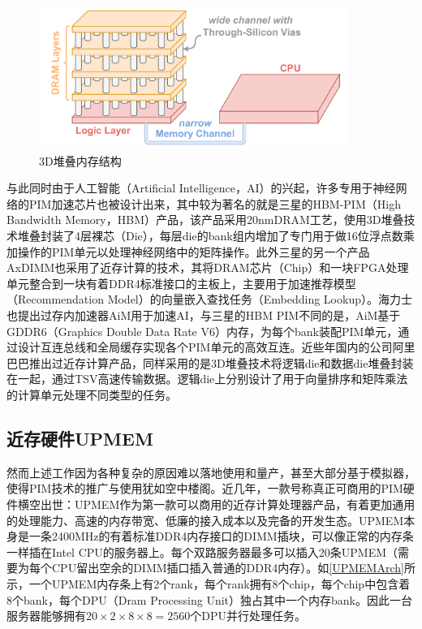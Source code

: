 \begin{figure}[!htbp]
	\centering
    \includegraphics[width=0.9\textwidth]{figures/3DStack.pdf}
    \caption{3D堆叠内存结构}
	\label{3DStack}
\end{figure}

与此同时由于人工智能（Artificial Intelligence，AI）的兴起，许多专用于神经网络的PIM加速芯片也被设计出来，其中较为著名的就是三星的HBM-PIM（High Bandwidth Memory，HBM）产品\cite{SamsungHBMPIM}，该产品采用20nmDRAM工艺，使用3D堆叠技术堆叠封装了4层裸芯（Die），每层die的bank组内增加了专门用于做16位浮点数乘加操作的PIM单元以处理神经网络中的矩阵操作。此外三星的另一个产品AxDIMM\cite{AxDIMM}也采用了近存计算的技术，其将DRAM芯片（Chip）和一块FPGA处理单元整合到一块有着DDR4标准接口的主板上，主要用于加速推荐模型（Recommendation Model）的向量嵌入查找任务（Embedding Lookup）。海力士也提出过存内加速器AiM\cite{AiM}用于加速AI，与三星的HBM PIM不同的是，AiM基于GDDR6（Graphics Double Data Rate V6）内存，为每个bank装配PIM单元，通过设计互连总线和全局缓存实现各个PIM单元的高效互连。近些年国内的公司阿里巴巴推出过近存计算产品\cite{AlibabaPIM}，同样采用的是3D堆叠技术将逻辑die和数据die堆叠封装在一起，通过TSV高速传输数据。逻辑die上分别设计了用于向量排序和矩阵乘法的计算单元处理不同类型的任务。

\subsection{近存硬件UPMEM}
然而上述工作因为各种复杂的原因难以落地使用和量产，甚至大部分基于模拟器，使得PIM技术的推广与使用犹如空中楼阁。近几年，一款号称真正可商用的PIM硬件横空出世：UPMEM作为第一款可以商用的近存计算处理器产品\cite{UPMEMHotChips}，有着更加通用的处理能力、高速的内存带宽、低廉的接入成本以及完备的开发生态。UPMEM本身是一条2400MHz的有着标准DDR4内存接口的DIMM插块，可以像正常的内存条一样插在Intel CPU的服务器上。每个双路服务器最多可以插入20条UPMEM（需要为每个CPU留出空余的DIMM插口插入普通的DDR4内存）。如\ref{UPMEMArch}所示，一个UPMEM内存条上有2个rank，每个rank拥有8个chip，每个chip中包含着8个bank，每个DPU（Dram Processing Unit）独占其中一个内存bank。因此一台服务器能够拥有$20\times 2\times 8\times 8 = 2560$个DPU并行处理任务。

